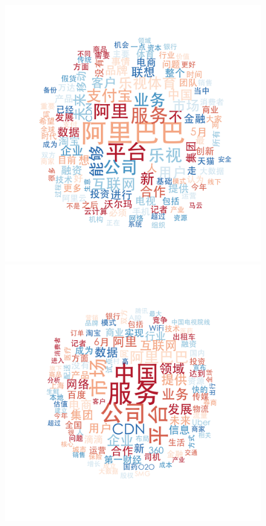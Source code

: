 \documentclass[11pt]{beamer}
\begin{document}
\begin{frame}
\begin{figure}
    \includegraphics[height=0.3\textheight]{plot/May-wordcloud}    \includegraphics[height=0.3\textheight]{plot/Jun-wordcloud}

\end{figure}
\end{frame}
\end{document}
